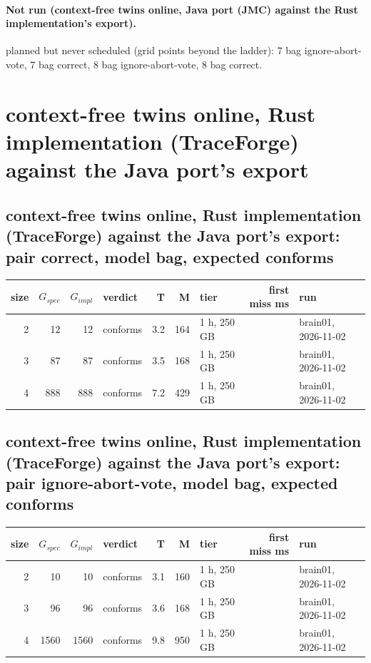 \documentclass[10pt]{article}
\begin{document}
\paragraph{Not run (context-free twins online, Java port (JMC) against the Rust implementation's export).}
planned but never scheduled (grid points beyond the ladder): 7 bag ignore-abort-vote, 7 bag correct, 8 bag ignore-abort-vote, 8 bag correct.\par
\section*{context-free twins online, Rust implementation (TraceForge) against the Java port's export}
\subsection*{context-free twins online, Rust implementation (TraceForge) against the Java port's export: pair \textsf{correct}, model bag, expected conforms}
\begin{longtable}{@{}rrrlrrlrl@{}}
\toprule
size & $G_{\mathit{spec}}$ & $G_{\mathit{impl}}$ & verdict & T & M & tier & first miss ms & run \\
\midrule
\endhead
\color{red} 2 & 12 & 12 & conforms & 3.2 & 164 & 1 h, 250 GB &  & brain01, 2026-11-02 \\
\color{red} 3 & 87 & 87 & conforms & 3.5 & 168 & 1 h, 250 GB &  & brain01, 2026-11-02 \\
\color{red} 4 & 888 & 888 & conforms & 7.2 & 429 & 1 h, 250 GB &  & brain01, 2026-11-02 \\
\bottomrule
\end{longtable}
\subsection*{context-free twins online, Rust implementation (TraceForge) against the Java port's export: pair \textsf{ignore-abort-vote}, model bag, expected conforms}
\begin{longtable}{@{}rrrlrrlrl@{}}
\toprule
size & $G_{\mathit{spec}}$ & $G_{\mathit{impl}}$ & verdict & T & M & tier & first miss ms & run \\
\midrule
\endhead
\color{red} 2 & 10 & 10 & conforms & 3.1 & 160 & 1 h, 250 GB &  & brain01, 2026-11-02 \\
\color{red} 3 & 96 & 96 & conforms & 3.6 & 168 & 1 h, 250 GB &  & brain01, 2026-11-02 \\
\color{red} 4 & 1560 & 1560 & conforms & 9.8 & 950 & 1 h, 250 GB &  & brain01, 2026-11-02 \\
\bottomrule
\end{longtable}
\end{document}
